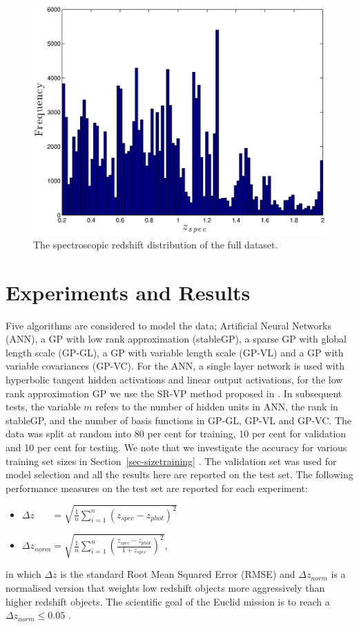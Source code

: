 \documentclass[useAMS,usenatbib,fleqn]{mn2e}
\begin{document}
\begin{figure}
       \centering
       \includegraphics[width=\columnwidth]{figures/zspec.eps}
        \caption{The spectroscopic redshift distribution of the full dataset.}
       \label{fig-zspec-hostogram}
\end{figure}

\section{Experiments and Results}
\label{sec-experiments}

Five algorithms are considered to model the data; Artificial Neural Networks (ANN), a GP with low rank approximation (stableGP), a sparse GP with global length scale (GP-GL), a GP with variable length scale (GP-VL) and a GP with variable covariances (GP-VC). For the ANN, a single layer network is used with hyperbolic tangent hidden activations and linear output activations, for the low rank approximation GP we use the SR-VP method proposed in \citep{foster2009}. In subsequent tests, the variable $m$ refers to the number of hidden units in ANN, the rank in stableGP, and the number of basis functions in GP-GL, GP-VL and GP-VC. The data was split at random into 80 per cent for training, 10 per cent for validation and 10 per cent for testing. We note that we investigate the accuracy for various training set sizes in Section~\ref{sec-sizetraining} . The validation set was used for model selection and all the results here are reported on the test set. The following performance measures on the test set are reported for each experiment:
\begin{itemize}
  \item $\Delta z_{\phantom{norm}} = \sqrt{\frac{1}{n}\sum_{i=1}^{n}\left(z_{spec}-z_{phot}\right)^{2}}$
  \item $\Delta z_{norm} = \sqrt{\frac{1}{n}\sum_{i=1}^{n}\left(\frac{z_{spec}-z_{phot}}{1+z_{spec}}\right)^{2}}$,
\end{itemize}
in which $\Delta z$ is the standard Root Mean Squared Error (RMSE) and $\Delta z_{norm}$ is a normalised version that weights low redshift objects more aggressively than higher redshift objects. The scientific goal of the Euclid mission is to reach a $\Delta z_{norm} \le 0.05$ \citep{laureijs2011}.
\end{document}
